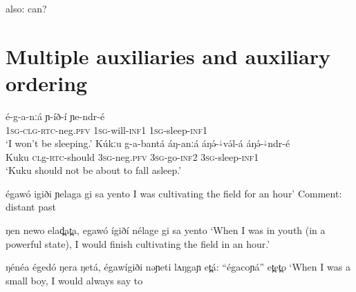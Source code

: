 also: can?

\section{Multiple auxiliaries and auxiliary ordering}

\ea 
\ea \gll  é-g-a-nːá ɲ-íð-í ɲe-ndr-é\\
\textsc{1sg-clg}-\textsc{rtc}-neg.\textsc{pfv} \textsc{1sg}-will-\textsc{inf1} \textsc{1sg}-sleep-\textsc{inf1}  \\
\glt `I won’t be sleeping.'
\ex \gll  Kúkːu g-a-bantá áŋ-anːá áŋə́-$^{↓}$və́l-á áŋə́-$^{↓}$ndr-é\\	
Kuku \textsc{cl}g-\textsc{rtc}-should  \textsc{3sg}-neg.\textsc{pfv}  \textsc{3sg}-go-\textsc{inf2}  \textsc{3sg}-sleep-\textsc{inf1}  \\
\glt `Kuku should not be about to fall asleep.'
\z 
\z 

égawó igiði ɲelaga gi sa yento	I was cultivating the field for an hour’
					Comment: distant past

ŋen newo elad̪at̪a, egawó ígiðí nélage gi sa yento
	‘When I was in youth (in a powerful state), I would finish cultivating the field in an hour.’


ŋénéa égedó ŋera ŋetá, égawígiði nəɲeti lʌŋgaɲ et̪á: “égacoɲá” et̪et̪o
			‘When I was a small boy, I would always say to 
